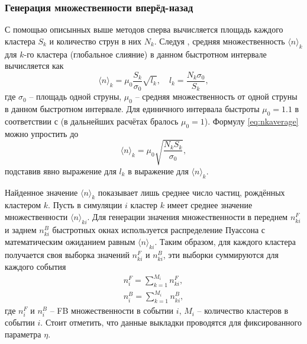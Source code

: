 \subsubsection{Генерация множественности вперёд-назад}
С помощью описынных выше методов сперва вычисляется площадь каждого кластера $S_k$ и количество струн в них $N_k$. Следуя \cite{MulReduction}, средняя множественность $\langle n \rangle_k$ для $k$-го кластера (глобальное слияние) в данном быстротном интервале вычисляется как 
\begin{equation} \label{eq:nkaverage}
	\langle n \rangle_k = \mu_0 \frac{S_k}{\sigma_0}\sqrt{l_k}, \quad l_k = \frac{N_k \sigma_0}{S_k},
\end{equation}
где $\sigma_0$ -- площадь одной струны, $\mu_0$ -- средняя множественность от одной струны в данном быстротном интервале. Для единичного интервала быстроты $\mu_0 = 1.1$ в соответствии с \cite{Mu0} (в дальнейших расчётах бралось $\mu_0 = 1$). Формулу \ref{eq:nkaverage} можно упростить до 
\begin{equation} \label{eq:nksimple}
	\langle n \rangle_k = \mu_0 \sqrt{\frac{N_k S_k}{\sigma_0}},
\end{equation}
подставив явно выражение для $l_k$ в выражение для $\langle n \rangle_k$.

Найденное значение $\langle n \rangle_k$ показывает лишь среднее число частиц, рождённых кластером $k$. Пусть в симуляции $i$ кластер $k$ имеет среднее значение множественности $\langle n \rangle_{ki}$. Для генерации значения множественности в переднем $n^F_{ki}$ и заднем $n^B_{ki}$ быстротных окнах используется распределение Пуассона с математическим ожиданием равным $\langle n \rangle_{ki}$. Таким образом, для каждого кластера получается своя выборка значений $n^F_{ki}$ и $n^B_{ki}$, эти выборки суммируются для каждого события 
\begin{equation} \label{eq:nfnb}
\begin{split}
	n^F_i = \sum_{k = 1}^{M_i} n^F_{ki}, \\
	n^B_i = \sum_{k = 1}^{M_i} n^B_{ki},
\end{split}
\end{equation}
где $n^F_i$ и $n^B_i$ -- FB множественности в событии $i$, $M_i$ -- количество кластеров в событии $i$. Стоит отметить, что данные выкладки проводятся для фиксированного параметра $\eta$. 
